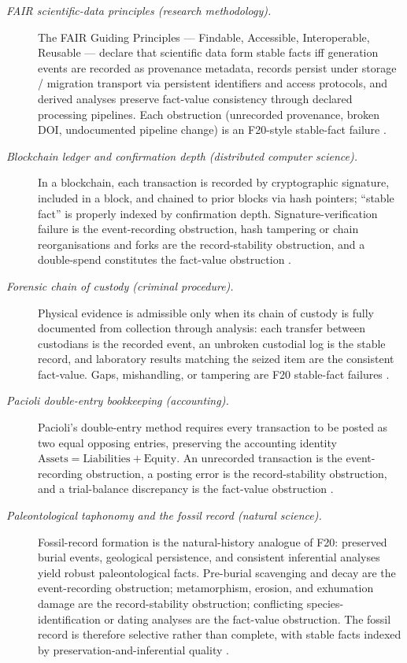\documentclass[11pt]{article}
\theoremstyle{definition}
\begin{document}
\begin{description}
\item[\emph{{FAIR} scientific-data principles (research
methodology).}]
The FAIR Guiding Principles --- Findable, Accessible,
Interoperable, Reusable --- declare that scientific data form
stable facts iff generation events are recorded as provenance
metadata, records persist under storage / migration transport via
persistent identifiers and access protocols, and derived analyses
preserve fact-value consistency through declared processing
pipelines.  Each obstruction (unrecorded provenance, broken DOI,
undocumented pipeline change) is an F20-style stable-fact failure
\citep{WilkinsonDumontier2016FAIRPrinciples}.

\item[\emph{Blockchain ledger and confirmation depth (distributed
computer science).}]
In a blockchain, each transaction is recorded by cryptographic
signature, included in a block, and chained to prior blocks via
hash pointers; ``stable fact'' is properly indexed by
confirmation depth.  Signature-verification failure is the
event-recording obstruction, hash tampering or chain
reorganisations and forks are the record-stability obstruction,
and a double-spend constitutes the fact-value obstruction
\citep{Nakamoto2008Bitcoin}.

\item[\emph{Forensic chain of custody (criminal procedure).}]
Physical evidence is admissible only when its chain of custody
is fully documented from collection through analysis: each
transfer between custodians is the recorded event, an unbroken
custodial log is the stable record, and laboratory results
matching the seized item are the consistent fact-value.  Gaps,
mishandling, or tampering are F20 stable-fact failures
\citep{Rice2008ElectronicEvidence}.

\item[\emph{Pacioli double-entry bookkeeping (accounting).}]
Pacioli's double-entry method requires every transaction to be
posted as two equal opposing entries, preserving the accounting
identity \(\text{Assets}=\text{Liabilities}+\text{Equity}\).  An
unrecorded transaction is the event-recording obstruction, a
posting error is the record-stability obstruction, and a
trial-balance discrepancy is the fact-value obstruction
\citep{Pacioli1494Summa}.

\item[\emph{Paleontological taphonomy and the fossil record
(natural science).}]
Fossil-record formation is the natural-history analogue of F20:
preserved burial events, geological persistence, and consistent
inferential analyses yield robust paleontological facts.  Pre-burial
scavenging and decay are the event-recording obstruction;
metamorphism, erosion, and exhumation damage are the
record-stability obstruction; conflicting species-identification
or dating analyses are the fact-value obstruction.  The fossil
record is therefore selective rather than complete, with stable
facts indexed by preservation-and-inferential quality
\citep{KidwellHolland2002QualityFossilRecord}.
\end{description}
\end{document}
